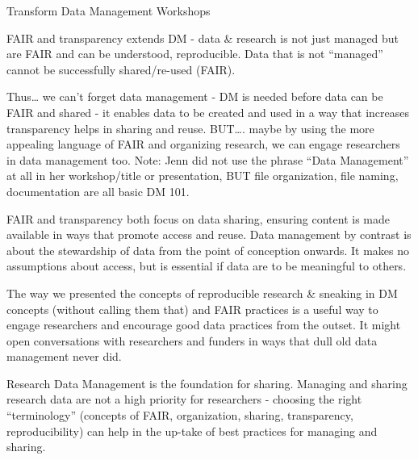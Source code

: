 \documentclass[
  ignorenonframetext,
]{beamer}
\begin{document}
\begin{frame}{Transform Data Management Workshops}
{FAIR and transparency extends DM - data \& research is not just managed
but are FAIR and can be understood, reproducible. Data that is not
``managed'' cannot be successfully shared/re-used (FAIR).

Thus\ldots{} we can't forget data management - DM is needed before data
can be FAIR and shared - it enables data to be created and used in a way
that increases transparency helps in sharing and reuse. BUT\ldots. maybe
by using the more appealing language of FAIR and organizing research, we
can engage researchers in data management too. Note: Jenn did not use
the phrase ``Data Management'' at all in her workshop/title or
presentation, BUT file organization, file naming, documentation are all
basic DM 101.

FAIR and transparency both focus on data sharing, ensuring content is
made available in ways that promote access and reuse. Data management by
contrast is about the stewardship of data from the point of conception
onwards. It makes no assumptions about access, but is essential if data
are to be meaningful to others.

The way we presented the concepts of reproducible research \& sneaking
in DM concepts (without calling them that) and FAIR practices is a
useful way to engage researchers and encourage good data practices from
the outset. It might open conversations with researchers and funders in
ways that dull old data management never did.

Research Data Management is the foundation for sharing. Managing and
sharing research data are not a high priority for researchers - choosing
the right ``terminology'' (concepts of FAIR, organization, sharing,
transparency, reproducibility) can help in the up-take of best practices
for managing and sharing.}
\end{frame}
\end{document}

